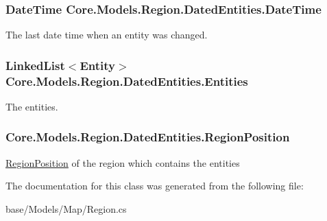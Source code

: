 \subsubsection[{Date\+Time}]{\setlength{\rightskip}{0pt plus 5cm}Date\+Time Core.\+Models.\+Region.\+Dated\+Entities.\+Date\+Time}\label{classCore_1_1Models_1_1Region_1_1DatedEntities_aef27626e67d6fbe5e549f57bf1233571}


The last date time when an entity was changed. 

\hypertarget{classCore_1_1Models_1_1Region_1_1DatedEntities_aaa8cacb9e8c527149f8176ad2b473bdc}{}
\subsubsection[{Entities}]{\setlength{\rightskip}{0pt plus 5cm}Linked\+List$<${\bf Entity}$>$ Core.\+Models.\+Region.\+Dated\+Entities.\+Entities}\label{classCore_1_1Models_1_1Region_1_1DatedEntities_aaa8cacb9e8c527149f8176ad2b473bdc}


The entities. 

\hypertarget{classCore_1_1Models_1_1Region_1_1DatedEntities_a9f7508c71a4e63dd41df20a6699c4359}{}
\subsubsection[{Region\+Position}]{ Core.\+Models.\+Region.\+Dated\+Entities.\+Region\+Position}\label{classCore_1_1Models_1_1Region_1_1DatedEntities_a9f7508c71a4e63dd41df20a6699c4359}


\hyperlink{classCore_1_1Models_1_1RegionPosition}{Region\+Position} of the region which contains the entities 



The documentation for this class was generated from the following file\+:\begin{DoxyCompactItemize}
\item 
base/\+Models/\+Map/Region.\+cs\end{DoxyCompactItemize}
